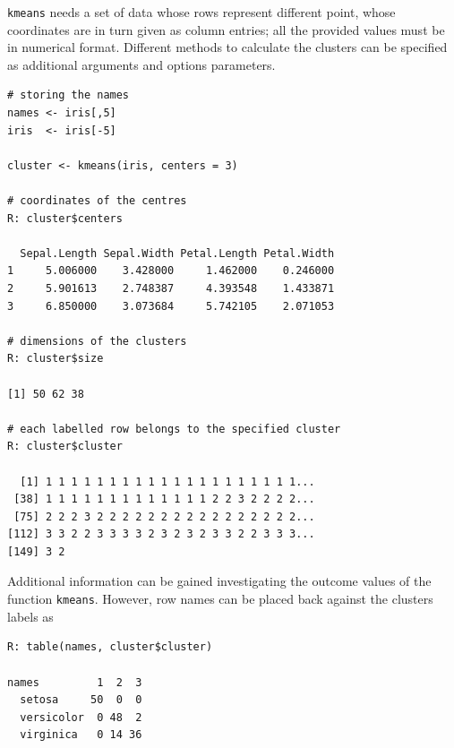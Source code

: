 \texttt{kmeans} needs a set of data whose 
rows represent different point, whose 
coordinates are in turn given as column
entries; all the provided values must be
in numerical format. Different methods to calculate
the clusters can be specified as additional
arguments and options parameters.
\begin{verbatim}
# storing the names 
names <- iris[,5]
iris  <- iris[-5]

cluster <- kmeans(iris, centers = 3)

# coordinates of the centres
R: cluster$centers

  Sepal.Length Sepal.Width Petal.Length Petal.Width
1     5.006000    3.428000     1.462000    0.246000
2     5.901613    2.748387     4.393548    1.433871
3     6.850000    3.073684     5.742105    2.071053

# dimensions of the clusters
R: cluster$size

[1] 50 62 38

# each labelled row belongs to the specified cluster
R: cluster$cluster

  [1] 1 1 1 1 1 1 1 1 1 1 1 1 1 1 1 1 1 1 1 1...
 [38] 1 1 1 1 1 1 1 1 1 1 1 1 1 2 2 3 2 2 2 2...
 [75] 2 2 2 3 2 2 2 2 2 2 2 2 2 2 2 2 2 2 2 2...
[112] 3 3 2 2 3 3 3 3 2 3 2 3 2 3 3 2 2 3 3 3...
[149] 3 2
\end{verbatim}
Additional information can be gained investigating
the outcome values of the function \texttt{kmeans}.
However, row names can be placed back against the 
clusters labels as
\begin{verbatim}
R: table(names, cluster$cluster)
            
names         1  2  3
  setosa     50  0  0
  versicolor  0 48  2
  virginica   0 14 36
\end{verbatim}
\medskip 

